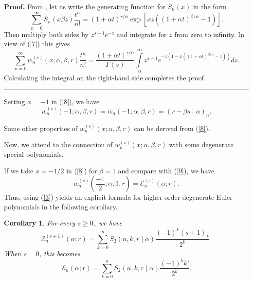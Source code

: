\documentclass{article}%
\newtheorem{corollary}[theorem]{Corollary}
\newenvironment{proof}[1][Proof]{\noindent\textbf{#1.} }{\ \rule{0.5em}{0.5em}}
\begin{document}
\begin{proof}
From \cite[Eq. (12)]{HSU}, let us write the generating function for
$S_{n}\left(  x\right)  $ in the form
\[
\sum_{n=0}^{\infty}S_{n}\left(  x\beta z\right)  \frac{t^{n}}{n!}=\left(
1+\alpha t\right)  ^{r/\alpha}\exp\left[  xz\left(  \left(  1+\alpha t\right)
^{\beta/\alpha}-1\right)  \right]  .
\]
Then multiply both sides by $z^{s-1}e^{-z}$ and integrate for $z$ from zero to
infinity. In view of (\ref{7}) this gives
\[
\sum_{n=0}^{\infty}w_{n}^{\left(  s\right)  }\left(  x;\alpha,\beta,r\right)
\frac{t^{n}}{n!}=\frac{\left(  1+\alpha t\right)  ^{r/\alpha}}{\Gamma\left(
s\right)  }%
{\displaystyle\int\limits_{0}^{\infty}}
z^{s-1}e^{-z\left(  1-x\left(  \left(  1+\alpha t\right)  ^{\beta/\alpha
}-1\right)  \right)  }dz.
\]
Calculating the integral on the right-hand side completes the proof.
\end{proof}

Setting $x=-1$ in (\ref{8}), we have%
\[
w_{n}^{\left(  s\right)  }\left(  -1;\alpha,\beta,r\right)  =w_{n}\left(
-1;\alpha,\beta,r\right)  =\left(  r-\beta s\mid\alpha\right)  _{n}.
\]


Some other properties of $w_{n}^{\left(  s\right)  }\left(  x;\alpha
,\beta,r\right)  $ can be derived from (\ref{8}).

Now, we attend to the connection of $w_{n}^{\left(  s\right)  }\left(
x;\alpha,\beta,r\right)  $ with some degenerate special polynomials.

If we take $x=-1/2$ in (\ref{8}) for $\beta=1$ and compare with (\ref{9}), we
have%
\[
w_{n}^{\left(  s\right)  }\left(  \frac{-1}{2};\alpha,1,r\right)
=\mathcal{E}_{n}^{\left(  s\right)  }\left(  \alpha;r\right)  .
\]
Thus, using (\ref{3}) yields an explicit formula for higher order degenerate
Euler polynomials in the following corollary.

\begin{corollary}
For every $s\geq0,$ we have%
\begin{equation}
\mathcal{E}_{n}^{\left(  s+1\right)  }\left(  \alpha;r\right)  =\sum_{k=0}%
^{n}S_{2}\left(  n,k,r\mid\alpha\right)  \frac{\left(  -1\right)
^{k}\left\langle s+1\right\rangle _{k}}{2^{k}}. \label{10}%
\end{equation}
When $s=0$, this becomes%
\begin{equation}
\mathcal{E}_{n}\left(  \alpha;r\right)  =\sum_{k=0}^{n}S_{2}\left(
n,k,r\mid\alpha\right)  \frac{\left(  -1\right)  ^{k}k!}{2^{k}}. \label{27}%
\end{equation}

\end{corollary}
\end{document}
